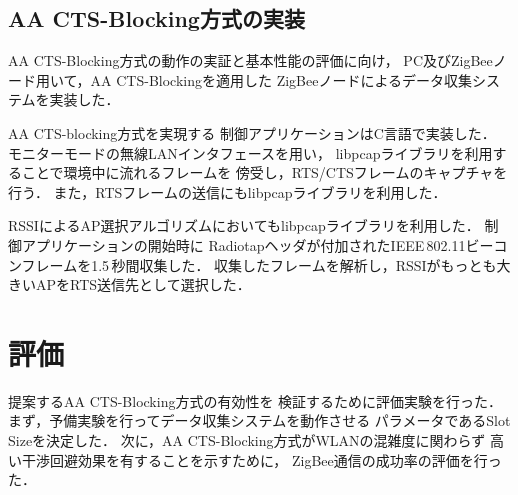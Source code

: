 \documentclass[12pt]{jreport}
\begin{document}
\section{AA CTS-Blocking方式の実装}
\label{sec:aa_cts_imple}

AA CTS-Blocking方式の動作の実証と基本性能の評価に向け，
PC及びZigBeeノード用いて，AA CTS-Blockingを適用した
ZigBeeノードによるデータ収集システムを実装した．

AA CTS-blocking方式を実現する
制御アプリケーションはC言語で実装した．
モニターモードの無線LANインタフェースを用い，
libpcapライブラリを利用することで環境中に流れるフレームを
傍受し，RTS/CTSフレームのキャプチャを行う．
また，RTSフレームの送信にもlibpcapライブラリを利用した．

RSSIによるAP選択アルゴリズムにおいてもlibpcapライブラリを利用した．
制御アプリケーションの開始時に
Radiotapヘッダが付加されたIEEE\,802.11ビーコンフレームを1.5\,秒間収集した．
収集したフレームを解析し，RSSIがもっとも大きいAPをRTS送信先として選択した．



\chapter{評価}
\label{eval}

提案するAA CTS-Blocking方式の有効性を
検証するために評価実験を行った．
まず，予備実験を行ってデータ収集システムを動作させる
パラメータであるSlot Sizeを決定した．
次に，AA CTS-Blocking方式がWLANの混雑度に関わらず
高い干渉回避効果を有することを示すために，
ZigBee通信の成功率の評価を行った．
\end{document}
